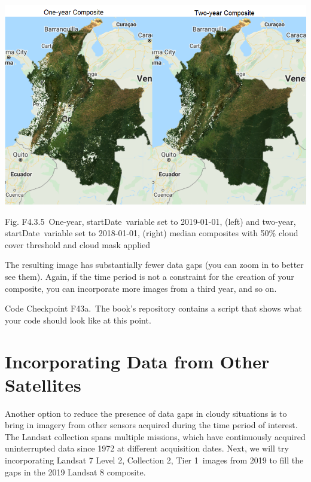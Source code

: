 \documentclass[
  letterpaper,
  DIV=11,
  numbers=noendperiod]{scrreprt}
\begin{document}
\includegraphics{./F4/image85.png}

Fig. F4.3.5~One-year, startDate~variable set to 2019-01-01, (left) and
two-year, startDate~variable set to 2018-01-01, (right) median
composites with 50\% cloud cover threshold and cloud mask applied

The resulting image has substantially fewer data gaps (you can zoom in
to better see them). Again, if the time period is not a constraint for
the creation of your composite, you can incorporate more images from a
third year, and so on.

\begin{tcolorbox}[enhanced jigsaw, left=2mm, breakable, rightrule=.15mm, opacityback=0, colframe=quarto-callout-note-color-frame, colbacktitle=quarto-callout-note-color!10!white, arc=.35mm, opacitybacktitle=0.6, toptitle=1mm, colback=white, leftrule=.75mm, title=\textcolor{quarto-callout-note-color}{\faInfo}\hspace{0.5em}{Note}, toprule=.15mm, bottomtitle=1mm, titlerule=0mm, bottomrule=.15mm, coltitle=black]

Code Checkpoint F43a.~The book's repository contains a script that shows
what your code should look like at this point.

\end{tcolorbox}

\hypertarget{incorporating-data-from-other-satellites}{%
\section{Incorporating Data from Other
Satellites}\label{incorporating-data-from-other-satellites}}

Another option to reduce the presence of data gaps in cloudy situations
is to bring in imagery from other sensors acquired during the time
period of interest. The Landsat collection spans multiple missions,
which have continuously acquired uninterrupted data since 1972 at
different acquisition dates. Next, we will try incorporating Landsat 7
Level 2, Collection 2, Tier 1~images from 2019 to fill the gaps in the
2019 Landsat 8 composite.
\end{document}
